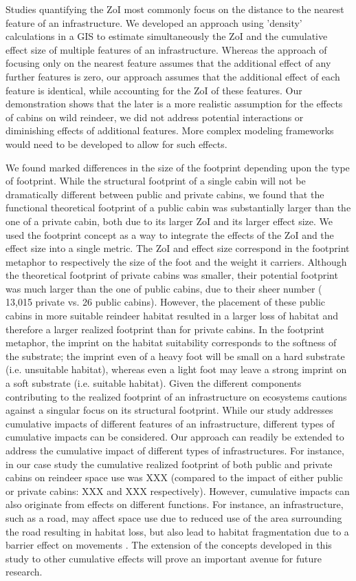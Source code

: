 \documentclass{article}
\begin{document}
Studies quantifying the ZoI most commonly focus on the distance to the nearest feature of an infrastructure. We developed an approach using 'density' calculations in a GIS to estimate simultaneously the ZoI and the cumulative effect size of multiple features of an infrastructure. Whereas the approach of focusing only on the nearest feature assumes that the additional effect of any further features is zero, our approach assumes that the additional effect of each feature is identical, while accounting for the ZoI of these features. Our demonstration shows that the later is a more realistic assumption for the effects of cabins on wild reindeer, we did not address potential interactions or diminishing effects of additional features. More complex modeling frameworks would need to be developed to allow for such effects. 

We found marked differences in the size of the footprint depending upon the type of footprint. While the structural footprint of a single cabin will not be dramatically different between public and private cabins, we found that the functional theoretical footprint of a public cabin was substantially larger than the one of a private cabin, both due to its larger ZoI and its larger effect size. We used the footprint concept as a way to integrate the effects of the ZoI and the effect size into a single metric. The ZoI and effect size correspond in the footprint metaphor to respectively the size of the foot and the weight it carriers. Although the theoretical footprint of private cabins was smaller, their potential footprint was much larger than the one of public cabins, due to their sheer number ( 13,015 private vs. 26 public cabins). However, the placement of these public cabins in more suitable reindeer habitat resulted in a larger loss of habitat and therefore a larger realized footprint than for private cabins. In the footprint metaphor, the imprint on the habitat suitability corresponds to the softness of the substrate; the imprint even of a heavy foot will be small on a hard substrate (i.e. unsuitable habitat), whereas even a light foot may leave a strong imprint on a soft substrate (i.e. suitable habitat). Given the different components contributing to the realized footprint of an infrastructure on ecosystems cautions against a singular focus on its structural footprint.   
While our study addresses cumulative impacts of different features of an infrastructure, different types of cumulative impacts can be considered. Our approach can readily be extended to address the cumulative impact of different types of infrastructures. For instance, in our case study the cumulative realized footprint of both public and private cabins on reindeer space use was XXX (compared to the impact of either public or private cabins: XXX and XXX respectively). However, cumulative impacts can also originate from effects on different functions. For instance, an infrastructure, such as a road, may affect space use due to reduced use of the area surrounding the road resulting in habitat loss, but also lead to habitat fragmentation due to a barrier effect on movements \citep{beyer2016you}. The extension of the concepts developed in this study to other cumulative effects will prove an important avenue for future research.
\end{document}
